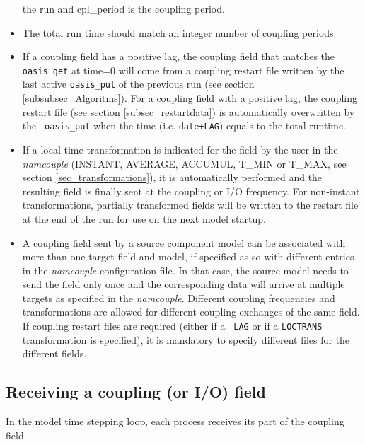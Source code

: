 \begin{itemize}
  the run and cpl\_period is the coupling period.
\item The total run time should match an integer number of coupling
  periods.
\item If a coupling field has a positive lag, the coupling field that
  matches the {\tt oasis\_get} at time=0 will come from a coupling
  restart file written by the last active {\tt oasis\_put} of the
  previous run (see section \ref{subsubsec_Algoritms}). For a coupling
  field with a positive lag, the coupling restart file (see section
  \ref{subsec_restartdata}) is automatically overwritten by the {\tt
    oasis\_put} when the time (i.e. {\tt date+LAG}) equals to the
  total runtime.
\item If a local time transformation is indicated for the field by the
  user in the {\it namcouple} (INSTANT, AVERAGE, ACCUMUL, T\_MIN or
  T\_MAX, see section \ref{sec_transformations}), it is automatically
  performed and the resulting field is finally sent at the coupling or
  I/O frequency.  For non-instant transformations, partially
  transformed fields will be written to the restart file at the end of
  the run for use on the next model startup.
\item A coupling field sent by a source component model can be
  associated with more than one target field and model, if specified
  as so with different entries in the {\it namcouple} configuration
  file. In that case, the source model needs to send the field only
  once and the corresponding data will arrive at multiple targets as
  specified in the {\it namcouple}. Different coupling frequencies and
  transformations are allowed for different coupling exchanges of the
  same field. If coupling restart files are required (either if a {\tt
    LAG} or if a {\tt LOCTRANS} transformation is specified), it is
  mandatory to specify different files for the different fields.

\end{itemize}

\subsection{Receiving a coupling (or I/O) field}

In the model time stepping loop, each process receives its part of the
coupling field.

